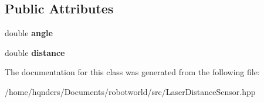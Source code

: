\subsection*{Public Attributes}
\begin{DoxyCompactItemize}
\item 
double {\bfseries angle}\hypertarget{class_model_1_1_distance_stimulus_ac2a26e553ae72f4cdb28147cbac38bc4}{}\label{class_model_1_1_distance_stimulus_ac2a26e553ae72f4cdb28147cbac38bc4}

\item 
double {\bfseries distance}\hypertarget{class_model_1_1_distance_stimulus_a509312aa1c6cc55236a3b81014ea6d7c}{}\label{class_model_1_1_distance_stimulus_a509312aa1c6cc55236a3b81014ea6d7c}

\end{DoxyCompactItemize}


The documentation for this class was generated from the following file\+:\begin{DoxyCompactItemize}
\item 
/home/hqnders/\+Documents/robotworld/src/Laser\+Distance\+Sensor.\+hpp\end{DoxyCompactItemize}
